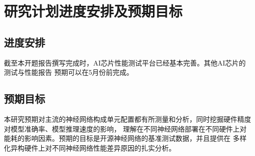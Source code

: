 \section{研究计划进度安排及预期目标}

\subsection{进度安排}
截至本开题报告撰写完成时，AI芯片性能测试平台已经基本完善。其他AI芯片的测试与性能报告
预期可以在5月份前完成。

\subsection{预期目标}
本研究预期对主流的神经网络构成单元配置都有所测量和分析，同时挖掘硬件精度对模型准确率、模型推理速度的影响，
理解在不同神经网络部署在不同硬件上对能耗的影响因素。预期的目标是开源神经网络的基准测试数据，并且提供在
多样化异构硬件上对不同神经网络性能差异原因的扎实分析。